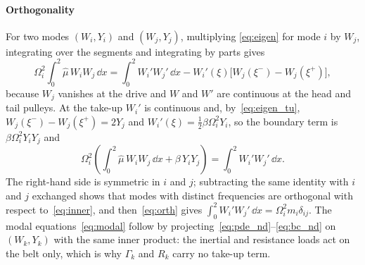 \paragraph{Orthogonality} For two modes $(W_i,Y_i)$ and $(W_j,Y_j)$, multiplying
\eqref{eq:eigen} for mode $i$ by $W_j$, integrating over the segments and integrating by
parts gives
\begin{equation}\label{eq:orth_derivation}
  \Omega_i^2\int_0^2\hat\mu\,W_iW_j\,\dd x=\int_0^2W_i'W_j'\,\dd x
  -W_i'(\xi)\bigl[W_j(\xi^-)-W_j(\xi^+)\bigr],
\end{equation}
because $W_j$ vanishes at the drive and $W$ and $W'$ are continuous at the head and
tail pulleys. At the take-up $W_i'$ is continuous and, by~\eqref{eq:eigen_tu},
$W_j(\xi^-)-W_j(\xi^+)=2Y_j$ and $W_i'(\xi)=\tfrac12\beta\Omega_i^2Y_i$, so the boundary term is
$\beta\Omega_i^2Y_iY_j$ and
\begin{equation}\label{eq:orth}
  \Omega_i^2\left(\int_0^2\hat\mu\,W_iW_j\,\dd x+\beta\,Y_iY_j\right)=\int_0^2W_i'W_j'\,\dd x .
\end{equation}
The right-hand side is symmetric in $i$ and $j$; subtracting the same identity with $i$
and $j$ exchanged shows that modes with distinct frequencies are orthogonal with
respect to~\eqref{eq:inner}, and then~\eqref{eq:orth} gives
$\int_0^2W_i'W_j'\,\dd x=\Omega_i^2m_i\delta_{ij}$. The modal equations~\eqref{eq:modal}
follow by projecting~\eqref{eq:pde_nd}--\eqref{eq:bc_nd} on $(W_k,Y_k)$ with the same
inner product: the inertial and resistance loads act on the belt only, which is why
$\Gamma_k$ and $R_k$ carry no take-up term.
